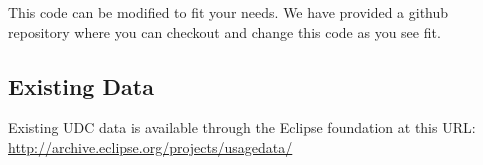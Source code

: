 This code can be modified to fit your needs.
We have provided a github repository where you can checkout 
and change this code as you see fit.

\subsection{Existing Data}

Existing UDC data is available through the Eclipse foundation at this URL:
\url{http://archive.eclipse.org/projects/usagedata/}
